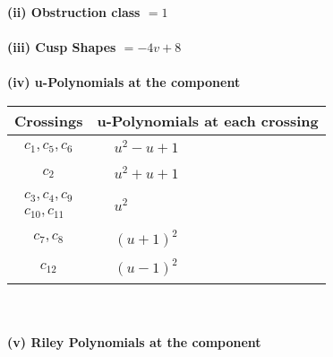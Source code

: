 \documentclass[1p]{elsarticle_modified}
\theoremstyle{definition}
\begin{document}
\flushleft \textbf{(ii) Obstruction class $= 1$}\\~\\
\flushleft \textbf{(iii) Cusp Shapes $= -4 v+8$}\\~\\
\newpage\renewcommand{\arraystretch}{1}
\flushleft \textbf{(iv) u-Polynomials at the component}\newline \\
\begin{tabular}{m{50pt}|m{274pt}}
Crossings & \hspace{64pt}u-Polynomials at each crossing \\
\hline $$\begin{aligned}c_{1},c_{5},c_{6}\end{aligned}$$&$\begin{aligned}
&u^2- u+1
\end{aligned}$\\
\hline $$\begin{aligned}c_{2}\end{aligned}$$&$\begin{aligned}
&u^2+u+1
\end{aligned}$\\
\hline $$\begin{aligned}c_{3},c_{4},c_{9}\\c_{10},c_{11}\end{aligned}$$&$\begin{aligned}
&u^2
\end{aligned}$\\
\hline $$\begin{aligned}c_{7},c_{8}\end{aligned}$$&$\begin{aligned}
&(u+1)^2
\end{aligned}$\\
\hline $$\begin{aligned}c_{12}\end{aligned}$$&$\begin{aligned}
&(u-1)^2
\end{aligned}$\\
\hline
\end{tabular}\\~\\
\newpage\renewcommand{\arraystretch}{1}
\flushleft \textbf{(v) Riley Polynomials at the component}\newline \\
\end{document}
